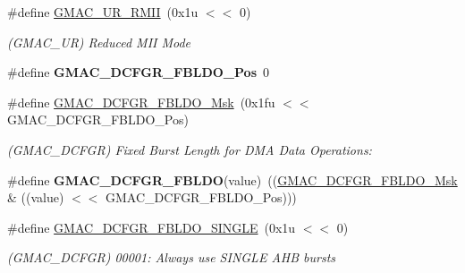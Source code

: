 \begin{DoxyCompactItemize}
\mbox{\label{group__SAMV71__GMAC_ga2152ef6b6505d61682c1c64bc68257ac}} 
\#define \mbox{\hyperlink{group__SAMV71__GMAC_ga2152ef6b6505d61682c1c64bc68257ac}{G\+M\+A\+C\+\_\+\+U\+R\+\_\+\+R\+M\+II}}~(0x1u $<$$<$ 0)
\begin{DoxyCompactList}\small\item\em (G\+M\+A\+C\+\_\+\+UR) Reduced M\+II Mode \end{DoxyCompactList}\item 
\mbox{\label{group__SAMV71__GMAC_ga0e1119ca667d6f05b1300dc485e9d192}} 
\#define {\bfseries G\+M\+A\+C\+\_\+\+D\+C\+F\+G\+R\+\_\+\+F\+B\+L\+D\+O\+\_\+\+Pos}~0
\item 
\mbox{\label{group__SAMV71__GMAC_gabb45c97d81990518102331c52a66110a}} 
\#define \mbox{\hyperlink{group__SAMV71__GMAC_gabb45c97d81990518102331c52a66110a}{G\+M\+A\+C\+\_\+\+D\+C\+F\+G\+R\+\_\+\+F\+B\+L\+D\+O\+\_\+\+Msk}}~(0x1fu $<$$<$ G\+M\+A\+C\+\_\+\+D\+C\+F\+G\+R\+\_\+\+F\+B\+L\+D\+O\+\_\+\+Pos)
\begin{DoxyCompactList}\small\item\em (G\+M\+A\+C\+\_\+\+D\+C\+F\+GR) Fixed Burst Length for D\+MA Data Operations\+: \end{DoxyCompactList}\item 
\mbox{\label{group__SAMV71__GMAC_ga19842f6820531899f6d2013acced0d33}} 
\#define {\bfseries G\+M\+A\+C\+\_\+\+D\+C\+F\+G\+R\+\_\+\+F\+B\+L\+DO}(value)~((\mbox{\hyperlink{group__SAMV71__GMAC_gabb45c97d81990518102331c52a66110a}{G\+M\+A\+C\+\_\+\+D\+C\+F\+G\+R\+\_\+\+F\+B\+L\+D\+O\+\_\+\+Msk}} \& ((value) $<$$<$ G\+M\+A\+C\+\_\+\+D\+C\+F\+G\+R\+\_\+\+F\+B\+L\+D\+O\+\_\+\+Pos)))
\item 
\mbox{\label{group__SAMV71__GMAC_ga010e4766787754396b3ad8babdf3a376}} 
\#define \mbox{\hyperlink{group__SAMV71__GMAC_ga010e4766787754396b3ad8babdf3a376}{G\+M\+A\+C\+\_\+\+D\+C\+F\+G\+R\+\_\+\+F\+B\+L\+D\+O\+\_\+\+S\+I\+N\+G\+LE}}~(0x1u $<$$<$ 0)
\begin{DoxyCompactList}\small\item\em (G\+M\+A\+C\+\_\+\+D\+C\+F\+GR) 00001\+: Always use S\+I\+N\+G\+LE A\+HB bursts \end{DoxyCompactList}\item 

\end{DoxyCompactItemize}
